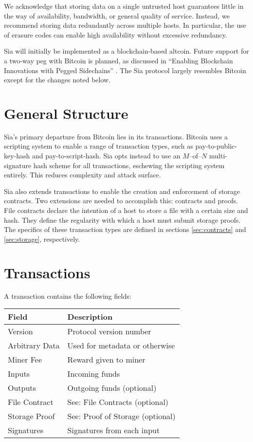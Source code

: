 \documentclass[twocolumn]{article}
\begin{document}
We acknowledge that storing data on a single untrusted host guarantees little in the way of availability, bandwidth, or general quality of service.
Instead, we recommend storing data redundantly across multiple hosts.
In particular, the use of erasure codes can enable high availability without excessive redundancy.

Sia will initially be implemented as a blockchain-based altcoin.
Future support for a two-way peg with Bitcoin is planned, as discussed in ``Enabling Blockchain Innovations with Pegged Sidechains'' \cite{side}.
The Sia protocol largely resembles Bitcoin except for the changes noted below.

\section{General Structure}
Sia's primary departure from Bitcoin lies in its transactions.
Bitcoin uses a scripting system to enable a range of transaction types, such as pay-to-public-key-hash and pay-to-script-hash.
Sia opts instead to use an $M$--of--$N$ multi-signature hash scheme for all transactions, eschewing the scripting system entirely.
This reduces complexity and attack surface.

Sia also extends transactions to enable the creation and enforcement of storage contracts.
Two extensions are needed to accomplish this: contracts and proofs.
File contracts declare the intention of a host to store a file with a certain size and hash.
They define the regularity with which a host must submit storage proofs.
The specifics of these transaction types are defined in sections \ref{sec:contracts} and \ref{sec:storage}, respectively.

\section{Transactions}
A transaction contains the following fields: \\

\noindent
\begin{tabular}{ l | l }
	\textbf{Field} & \textbf{Description} \\ \hline
	Version        & Protocol version number \\
	Arbitrary Data & Used for metadata or otherwise \\
	Miner Fee      & Reward given to miner \\
	Inputs         & Incoming funds \\
	Outputs        & Outgoing funds (optional) \\
	File Contract  & See: File Contracts (optional) \\
	Storage Proof  & See: Proof of Storage (optional) \\
	Signatures     & Signatures from each input \\
\end{tabular}
\end{document}
